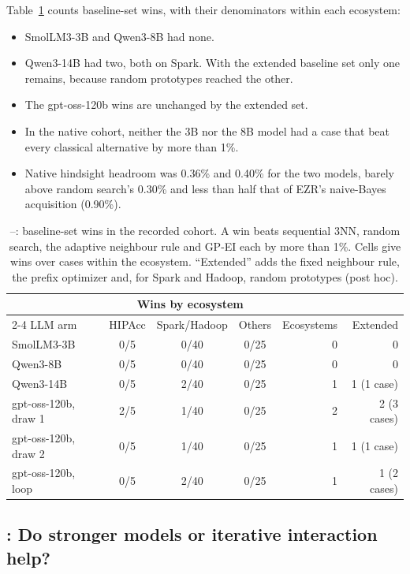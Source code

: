Table~\ref{tab:rq2} counts baseline-set wins, with their denominators within each ecosystem:
\begin{itemize}
  \item SmolLM3-3B and Qwen3-8B had none.
  \item Qwen3-14B had two, both on Spark. With the extended baseline set only one remains, because random prototypes reached the other.
  \item The gpt-oss-120b wins are unchanged by the extended set.
  \item In the native cohort, neither the 3B nor the 8B model had a case that beat every classical alternative by more than 1\%.
  \item Native hindsight headroom was 0.36\% and 0.40\% for the two models, barely above random search's 0.30\% and less than half that of EZR's naive-Bayes acquisition (0.90\%).
\end{itemize}

\begin{table}[t]
\centering
\caption{--: baseline-set wins in the recorded cohort. A win beats sequential 3NN, random search, the adaptive neighbour rule and GP-EI each by more than 1\%. Cells give wins over cases within the ecosystem. ``Extended'' adds the fixed neighbour rule, the prefix optimizer and, for Spark and Hadoop, random prototypes (post hoc).}
\label{tab:rq2}
\small
\begin{tabular}{lcccrr}
\toprule
 & \multicolumn{3}{c}{Wins by ecosystem} & & \\
\cmidrule(lr){2-4}
LLM arm & HIPAcc & Spark/Hadoop & Others & Ecosystems & Extended \\
\midrule
SmolLM3-3B & 0/5 & 0/40 & 0/25 & 0 & 0 \\
Qwen3-8B & 0/5 & 0/40 & 0/25 & 0 & 0 \\
Qwen3-14B & 0/5 & 2/40 & 0/25 & 1 & 1 (1 case) \\
gpt-oss-120b, draw 1 & 2/5 & 1/40 & 0/25 & 2 & 2 (3 cases) \\
gpt-oss-120b, draw 2 & 0/5 & 1/40 & 0/25 & 1 & 1 (1 case) \\
gpt-oss-120b, loop & 0/5 & 2/40 & 0/25 & 1 & 1 (2 cases) \\
\bottomrule
\end{tabular}
\end{table}

\subsection{: Do stronger models or iterative interaction help?}
\label{sec:rq3}

